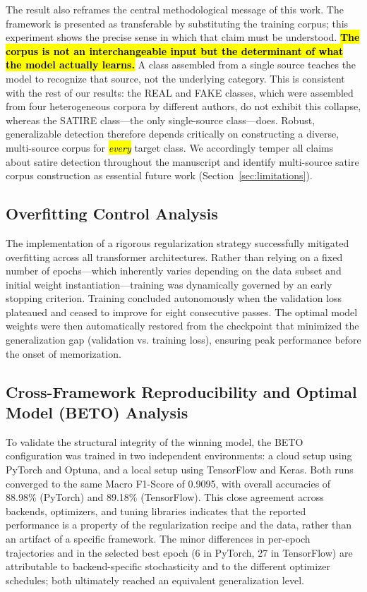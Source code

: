 \documentclass[informatics,article,accept,pdftex,moreauthors]{Definitions/mdpi}
\begin{document}
The result also reframes the central methodological message of this work. The framework is presented as transferable by substituting the training corpus; this experiment shows the precise sense in which that claim must be understood. \textbf{\hl{The corpus is not an interchangeable input but the determinant of what the model actually learns.}} A class assembled from a single source teaches the model to recognize that source, not the underlying category. This is consistent with the rest of our results: the REAL and FAKE classes, which were assembled from four heterogeneous corpora by different authors, do not exhibit this collapse, whereas the SATIRE class—the only single-source class—does. Robust, generalizable detection therefore depends critically on constructing a diverse, multi-source corpus for \emph{\hl{every}} target class. We accordingly temper all claims about satire detection throughout the manuscript and identify multi-source satire corpus construction as essential future work (Section~\ref{sec:limitations}).

\subsection{Overfitting Control Analysis}
The implementation of a rigorous regularization strategy successfully mitigated overfitting across all transformer architectures. Rather than relying on a fixed number of epochs—which inherently varies depending on the data subset and initial weight instantiation—training was dynamically governed by an early stopping criterion. Training concluded autonomously when the validation loss plateaued and ceased to improve for eight consecutive passes. The optimal model weights were then automatically restored from the checkpoint that minimized the generalization gap (validation vs. training loss), ensuring peak performance before the onset of memorization. 

\subsection{Cross-Framework Reproducibility and Optimal Model (BETO) Analysis}
To validate the structural integrity of the winning model, the BETO configuration was trained in two independent environments: a cloud setup using PyTorch and Optuna, and a local setup using TensorFlow and Keras. Both runs converged to the same Macro F1-Score of 0.9095, with overall accuracies of 88.98\% (PyTorch) and 89.18\% (TensorFlow). This close agreement across backends, optimizers, and tuning libraries indicates that the reported performance is a property of the regularization recipe and the data, rather than an artifact of a specific framework. The minor differences in per-epoch trajectories and in the selected best epoch (6 in PyTorch, 27 in TensorFlow) are attributable to backend-specific stochasticity and to the different optimizer schedules; both ultimately reached an equivalent generalization level.
\end{document}
